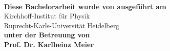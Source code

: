 \begin{titlepage}

\begin{center}
\vspace*{2cm}
\huge{\textbf{\thesisTitleGerman}}\\
\end{center}
\vspace*{10cm}
\large
\begin{center}
{\bf Diese Bachelorarbeit wurde von \thesisAuthor{} ausgeführt am} \\
\vspace*{0.2cm}
{\sc Kirchhoff-Institut für Physik\\

\vspace*{0.2cm}
Ruprecht-Karls-Universität Heidelberg\\}
\vspace*{0.2cm}
{\bf unter der Betreuung von}\\
\vspace*{0.2cm}
{\bf Prof. Dr. Karlheinz Meier}\\
\end{center}

\clearpage

\vspace*{15cm}
\begin{center}
\end{center}


\end{titlepage}

